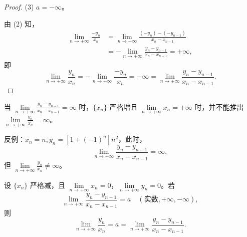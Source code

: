 \begin{proof}
(3) $a = -\infty$。

由 (2) 知，
\begin{align*}
\lim_{n\to+\infty} \frac{-y_n}{x_n} &= \lim_{n\to+\infty} \frac{(-y_n) - (-y_{n-1})}{x_n - x_{n-1}}\\
&= -\lim_{n\to+\infty} \frac{y_n - y_{n-1}}{x_n - x_{n-1}} = +\infty,
\end{align*}
即
\[
\lim_{n\to+\infty} \frac{y_n}{x_n} = -\lim_{n\to+\infty} \frac{-y_n}{x_n} = -\infty = \lim_{n\to+\infty} \frac{y_n - y_{n-1}}{x_n - x_{n-1}}.
\]
\end{proof}

\begin{remark}\label{rem:1.6.1}
当 $\lim\limits_{n\to+\infty} \frac{y_n - y_{n-1}}{x_n - x_{n-1}} = \infty$ 时，$\{x_n\}$ 严格增且 $\lim\limits_{n\to+\infty} x_n = +\infty$ 时，并不能推出 $\lim\limits_{n\to+\infty} \frac{y_n}{x_n} = \infty$。

反例：$x_n = n, y_n = \left[1 + (-1)^n\right]n^2$，此时，
\[
\lim_{n\to+\infty} \frac{y_n - y_{n-1}}{x_n - x_{n-1}} = \infty,
\]
但 $\lim\limits_{n\to+\infty} \frac{y_n}{x_n} \neq \infty$。
\end{remark}

\begin{theorem}\label{thm:1.6.2}
设 $\{x_n\}$ 严格减，且 $\lim\limits_{n\to+\infty} x_n = 0$，$\lim\limits_{n\to+\infty} y_n = 0$。若
\[
\lim_{n\to+\infty} \frac{y_n - y_{n-1}}{x_n - x_{n-1}} = a\quad (\text{实数}, +\infty, -\infty),
\]
则
\[
\lim_{n\to+\infty} \frac{y_n}{x_n} = a = \lim_{n\to+\infty} \frac{y_n - y_{n-1}}{x_n - x_{n-1}}.
\]
\end{theorem}

